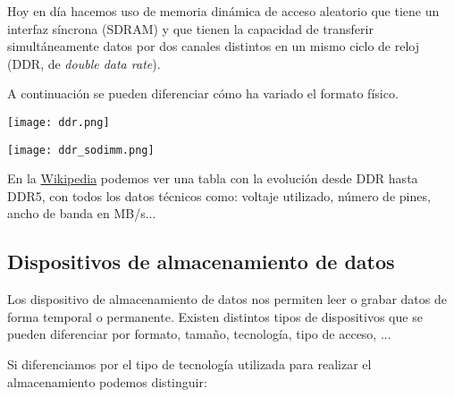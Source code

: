 Hoy en día hacemos uso de memoria dinámica de acceso aleatorio que tiene un interfaz síncrona (SDRAM) y que tienen la capacidad de transferir simultáneamente datos por dos canales distintos en un mismo ciclo de reloj (DDR, de \textit{double data rate}).

A continuación se pueden diferenciar cómo ha variado el formato físico.

{
    \hfill
\begin{minipage}{0.45\linewidth}
    \texttt{[image: ddr.png]}
    \vspace{-30pt}
\end{minipage}
\hfill\hfill
\begin{minipage}{0.3\linewidth}
    \texttt{[image: ddr\_sodimm.png]}
    \vspace{-30pt}
\end{minipage}
\hfill
}

En la \href{https://en.wikipedia.org/wiki/DDR_SDRAM#Generations}{Wikipedia} podemos ver una tabla con la evolución desde DDR hasta DDR5, con todos los datos técnicos como: voltaje utilizado, número de pines, ancho de banda en MB/s...


\subsection{Dispositivos de almacenamiento de datos}

Los dispositivo de almacenamiento de datos nos permiten leer o grabar datos de forma temporal o permanente. Existen distintos tipos de dispositivos que se pueden diferenciar por formato, tamaño, tecnología, tipo de acceso, ...

Si diferenciamos por el tipo de tecnología utilizada para realizar el almacenamiento podemos distinguir:

